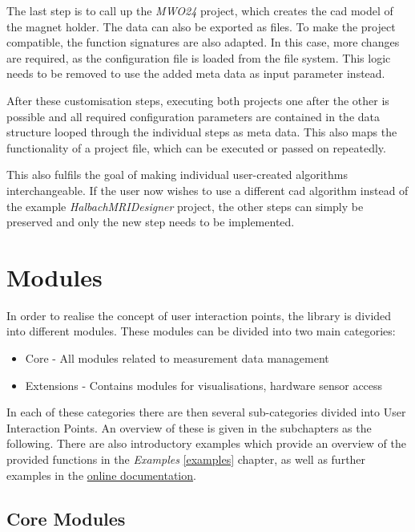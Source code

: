 The last step is to call up the \emph{MWO24}  project,
which creates the \gls{cad} model of the magnet holder. The data can
also be exported as files. To make the project compatible, the function
signatures are also adapted. In this case, more changes are required, as
the configuration file is loaded from the file system. This logic needs
to be removed to use the added meta data as input parameter instead.

After these customisation steps, executing both projects one after the
other is possible and all required configuration parameters are
contained in the data structure looped through the individual steps as
meta data. This also maps the functionality of a project file, which can
be executed or passed on repeatedly.

This also fulfils the goal of making individual user-created algorithms
interchangeable. If the user now wishes to use a different \gls{cad}
algorithm instead of the example \emph{HalbachMRIDesigner}
 project, the other steps can simply be preserved and
only the new step needs to be implemented.

\hypertarget{modules}{%
\section{Modules}\label{modules}}

In order to realise the concept of user interaction points, the library
is divided into different modules. These modules can be divided into two
main categories:

\begin{itemize}
\tightlist
\item
  Core - All modules related to measurement data management
\item
  Extensions - Contains modules for visualisations, hardware sensor
  access
\end{itemize}

In each of these categories there are then several sub-categories
divided into User Interaction Points. An overview of these is given in
the subchapters as the following. There are also introductory examples
which provide an overview of the provided functions in the
\emph{Examples} \ref{examples} chapter, as well as further examples in
the
\href{https://magneticreadoutprocessing.readthedocs.io/en/latest/}{online documentation}.

\hypertarget{core-modules}{%
\subsection{Core Modules}\label{core-modules}}

